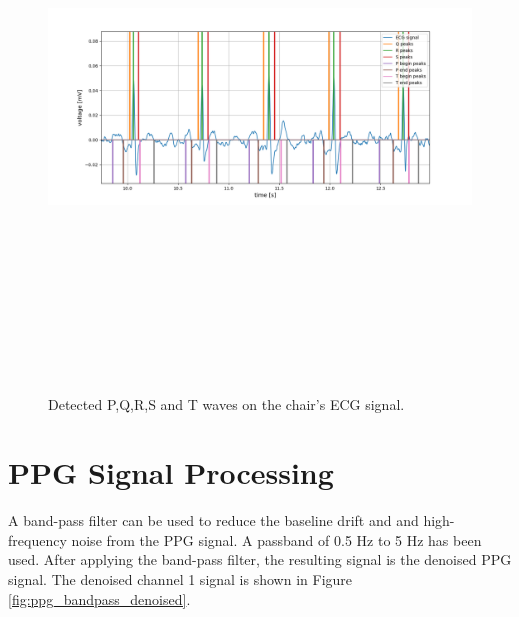 \begin{figure}[htpb]
	\centering
	\includegraphics[width=15cm,height=15cm,keepaspectratio=true]{images/device_ecg_feature_extraction.png}
	\caption{
		Detected P,Q,R,S and T waves on the chair's ECG signal.
	}
	\label{fig:device_ecg_feature_extraction}
\end{figure}

\section{PPG Signal Processing}
A band-pass filter can be used to reduce the baseline drift and and high-frequency noise from the PPG signal. A passband of 0.5 Hz to 5 Hz has been used. After applying the band-pass filter, the resulting signal is the denoised PPG signal. The denoised channel 1 signal is shown in Figure \ref{fig:ppg_bandpass_denoised}. 

